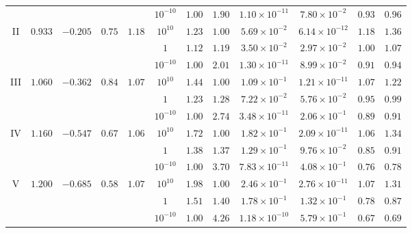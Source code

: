 \documentclass[twocolumn,aps,showpacs,showkeys,prd,superscriptaddress,byrevtex, amsmath]{revtex4-1}
\begin{document}
\begin{table}[t]
\begin{tabular}{c c c c c  c c c c c c c}
 &  &  &  &  & $10^{-10}$ & $1.00$ & $1.90$ & $1.10 \times 10^{-11}$ & $7.80 \times 10^{-2}$ & $0.93$ & $0.96$\\ 

II & $0.933$ & $-0.205$ & $0.75$ & $1.18$ & $10^{10}$ & $1.23$ & $1.00$ & $5.69 \times 10^{-2}$ & $6.14 \times 10^{-12}$ & $1.18$ & $1.36$\\ 

 &  &  &  &  & $1$ & $1.12$ & $1.19$ & $3.50 \times 10^{-2}$ & $2.97 \times 10^{-2}$ & $1.00$ & $1.07$\\ 

 &  &  &  &  & $10^{-10}$ & $1.00$ & $2.01$ & $1.30 \times 10^{-11}$ & $8.99 \times 10^{-2}$ & $0.91$ & $0.94$ \\ 

III & $1.060$ & $-0.362$ & $0.84$ & $1.07$ & $10^{10}$ & $1.44$ & $1.00$ & $1.09 \times 10^{-1}$ & $1.21 \times 10^{-11}$ & $1.07$ & $1.22$\\ 

 &  &  &  &  & $1$ & $1.23$ & $1.28$ & $7.22 \times 10^{-2}$ & $5.76 \times 10^{-2}$ & $0.95$ & $0.99$ \\ 

 &  &  &  &  & $10^{-10}$ & $1.00$ & $2.74$ & $3.48 \times 10^{-11}$ & $2.06 \times 10^{-1}$ & $0.89$ & $0.91$\\ 
 
IV & $1.160$ & $-0.547$ & $0.67$ & $1.06$ & $10^{10}$ & $1.72$ & $1.00$ & $1.82\times 10^{-1}$ & $2.09 \times 10^{-11}$ & $1.06$ & $1.34$ \\ 

 &  &  &  &  & $1$ & $1.38$ & $1.37$ & $1.29 \times 10^{-1}$ & $9.76 \times 10^{-2}$ & $0.85$ & $0.91$\\ 

 &  &  &  &  & $10^{-10}$ & $1.00$ & $3.70$ & $7.83 \times 10^{-11}$ & $4.08\times 10^{-1}$ & $0.76$ & $0.78$ \\ 

V & $1.200$ & $-0.685$ & $0.58$ & $1.07$ & $10^{10}$ & $1.98$ & $1.00$ & $2.46 \times 10^{-1}$ & $2.76 \times 10^{-11}$ & $1.07$ & $1.31$\\ 

 &  &  &  &  & $1$ & $1.51$ & $1.40$ & $1.78 \times 10^{-1}$ & $1.32\times 10^{-1}$ & $0.78$ & $0.87$ \\ 

 &  &  &  &  & $10^{-10}$ & $1.00$ & $4.26$ & $1.18 \times 10^{-10}$ & $5.79\times 10^{-1}$ & $0.67$ & $0.69$ \\ 
  

\end{tabular}
\end{table}
\end{document}
